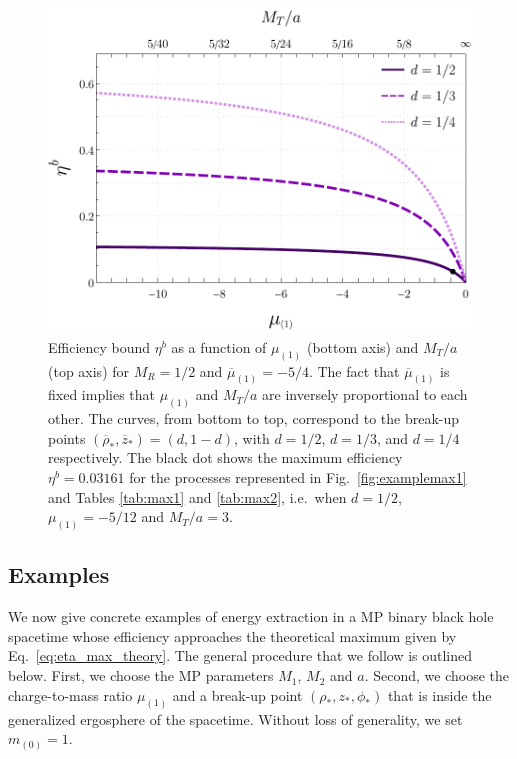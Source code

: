\begin{figure}[!ht]
  \centering
  \includegraphics[width=\linewidth]{img/penrose_binaries/fig10.pdf}
  \caption{Efficiency bound $\eta ^ b$ as a function of $\mu_{(1)}$ (bottom axis) and $M_T/a$ (top axis) for $M_R=1/2$ and $\overline \mu _{(1)} = -5/4$. The fact that $\overline \mu _{(1)}$ is fixed implies that $\mu_{(1)}$ and $M_T/a$ are inversely proportional to each other. The curves, from bottom to top, correspond to the break-up points $(\overline \rho_*, \overline z_*)=(d,1-d)$, with $d=1/2$, $d=1/3$, and $d=1/4$ respectively. The black dot shows the maximum efficiency $\eta^b = 0.03161$ for the processes represented in Fig.~\ref{fig:examplemax1} and Tables \ref{tab:max1} and \ref{tab:max2}, i.e.~when $d=1/2$, $\mu_{(1)} = - 5/12$ and $M_T/a=3$.}
  \label{fig:efficiency1}
\end{figure}

\subsection{Examples}

We now give concrete examples of energy extraction in a MP binary black hole spacetime whose efficiency approaches the theoretical maximum given by Eq.~\eqref{eq:eta_max_theory}. The general procedure that we follow is outlined below. First, we choose the MP parameters $M_1$, $M_2$ and $a$. Second, we choose the charge-to-mass ratio $\mu_{(1)}$ and a break-up point $(\rho_*,z_*,\phi_*)$ that is inside the generalized ergosphere of the spacetime. Without loss of generality, we set $m_{(0)}=1$.

